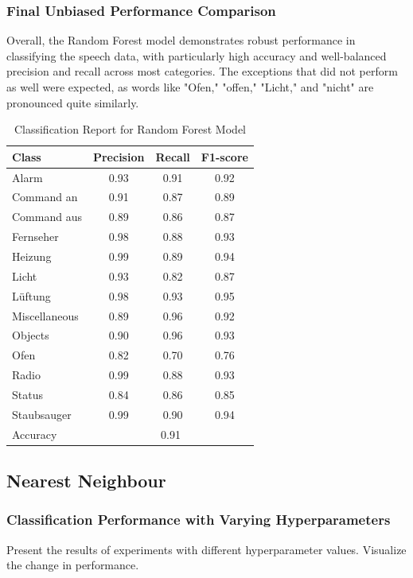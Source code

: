 \subsubsection{Final Unbiased Performance Comparison}
Overall, the Random Forest model demonstrates robust performance in classifying the speech data, with particularly high accuracy and well-balanced precision and recall across most categories. The exceptions that did not perform as well were expected, as words like "Ofen," "offen," "Licht," and "nicht" are pronounced quite similarly.

\begin{table}
  \caption{Classification Report for Random Forest Model}
  \label{tab:classification_report}
  \centering
  \begin{tabular}{lccc}
    \toprule
    Class        & Precision & Recall & F1-score \\
    \midrule
    Alarm        & 0.93 & 0.91 & 0.92 \\
    Command an   & 0.91 & 0.87 & 0.89 \\
    Command aus  & 0.89 & 0.86 & 0.87 \\
    Fernseher    & 0.98 & 0.88 & 0.93 \\
    Heizung      & 0.99 & 0.89 & 0.94 \\
    Licht        & 0.93 & 0.82 & 0.87 \\
    Lüftung      & 0.98 & 0.93 & 0.95 \\
    Miscellaneous & 0.89 & 0.96 & 0.92 \\
    Objects      & 0.90 & 0.96 & 0.93 \\
    Ofen         & 0.82 & 0.70 & 0.76 \\
    Radio        & 0.99 & 0.88 & 0.93 \\
    Status       & 0.84 & 0.86 & 0.85 \\
    Staubsauger  & 0.99 & 0.90 & 0.94 \\
    \midrule
    Accuracy     & \multicolumn{3}{c}{0.91} \\
    \bottomrule
  \end{tabular}
\end{table}

\subsection{Nearest Neighbour}
\subsubsection{Classification Performance with Varying Hyperparameters}
Present the results of experiments with different hyperparameter values. Visualize the change in performance.

